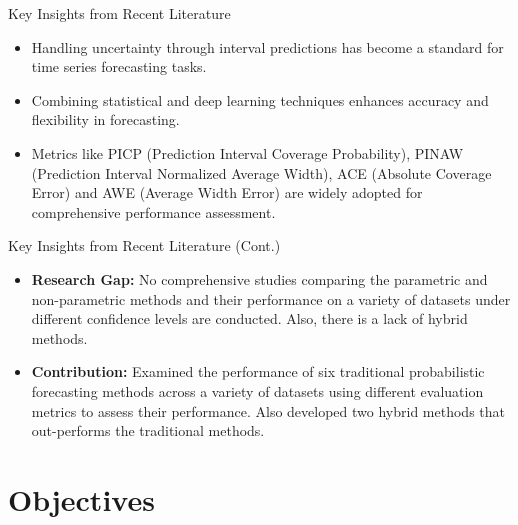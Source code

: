 \documentclass[xcolor=dvipsnames,aspectratio=169]{beamer}
\begin{document}
\begin{frame}{Key Insights from Recent Literature}
    \begin{itemize}
        \item Handling uncertainty through interval predictions has become a standard for time series forecasting tasks.
        \item Combining statistical and deep learning techniques enhances accuracy and flexibility in forecasting.
        \item Metrics like PICP (Prediction Interval Coverage Probability), PINAW (Prediction Interval Normalized Average Width), ACE (Absolute Coverage Error) and AWE (Average Width Error) are widely adopted for comprehensive performance assessment.
    \end{itemize}
\end{frame}


\begin{frame}{Key Insights from Recent Literature (Cont.)}
    \begin{itemize}
        \item \textbf{Research Gap:} No comprehensive studies comparing the parametric and non-parametric methods and their performance on a variety of datasets under different confidence levels are conducted. Also, there is a lack of hybrid methods.

        \item \textbf{Contribution: } Examined the performance of six traditional probabilistic forecasting methods across a variety of datasets using different evaluation metrics to assess their performance. Also developed two hybrid methods that out-performs the traditional methods.
    \end{itemize}
\end{frame}



\section{Objectives}
\end{document}
